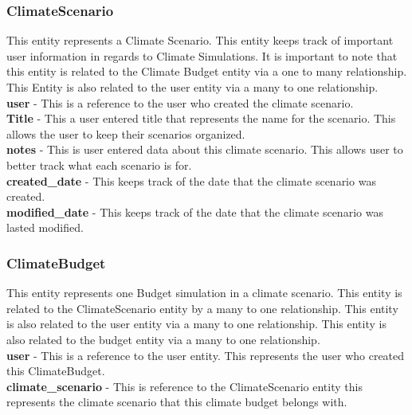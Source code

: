 \documentclass[onecolumn, draftclsnofoot,10pt, compsoc]{article}
\begin{document}
				\subsubsection{ClimateScenario}
					This entity represents a Climate Scenario. This entity keeps track of important user information in regards to Climate Simulations. It is important to note that this entity is related to the Climate Budget entity via a one to many relationship. This Entity is also related to the user entity via a many to one relationship.\\

					\textbf{user} - This is a reference to the user who created the climate scenario.\\

					\textbf{Title} - This a user entered title that represents the name for the scenario. This allows the user to keep their scenarios organized.\\

					\textbf{notes} - This is user entered data about this climate scenario. This allows user to better track what each scenario is for.\\

					\textbf{created\_date} - This keeps track of the date that the climate scenario was created.\\

					\textbf{modified\_date} - This keeps track of the date that the climate scenario was lasted modified.\\

				\subsubsection{ClimateBudget}
					This entity represents one Budget simulation in a climate scenario. This entity is related to the ClimateScenario entity by a many to one relationship. This entity is also related to the user entity via a many to one relationship. This entity is also related to the budget entity via a many to one relationship.\\

					\textbf{user} - This is a reference to the user entity. This represents the user who created this ClimateBudget.\\

					\textbf{climate\_scenario} - This is reference to the ClimateScenario entity this represents the climate scenario that this climate budget belongs with.\\
\end{document}
